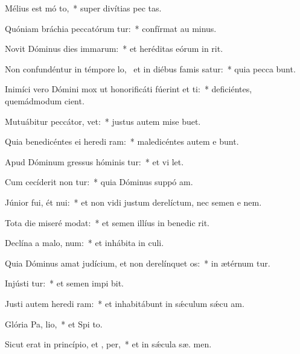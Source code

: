 \item Mélius est mó to,~* super divítias pec tas.
\item Quóniam bráchia peccatórum tur:~* confírmat au  minus.
\item Novit Dóminus dies immarum:~* et heréditas eórum in  rit.
\item Non confundéntur in témpore lo,~\pscross{} et in diébus famis satur:~* quia pecca bunt.
\item Inimíci vero Dómini mox ut honorificáti fúerint et ti:~* deficiéntes, quemádmodum  cient.
\item Mutuábitur peccátor,   vet:~* justus autem mise  buet.
\item Quia benedicéntes ei heredi ram:~* maledicéntes autem e bunt.
\item Apud Dóminum gressus hóminis tur:~* et vi  let.
\item Cum cecíderit non tur:~* quia Dóminus suppó  am.
\item Júnior fui, ét nui:~* et non vidi justum derelíctum, nec semen e  nem.
\item Tota die miseré  modat:~* et semen illíus in benedic rit.
\item Declína a malo,   num:~* et inhábita in  culi.
\item Quia Dóminus amat judícium, et non derelínquet  os:~* in ætérnum tur.
\item Injústi tur:~* et semen impi bit.
\item Justi autem heredi ram:~* et inhabitábunt in sǽculum sǽcu  am.
\item Glória Pa,  lio,~* et Spi to.
\item Sicut erat in princípio, et ,  per,~* et in sǽcula sæ. men.
